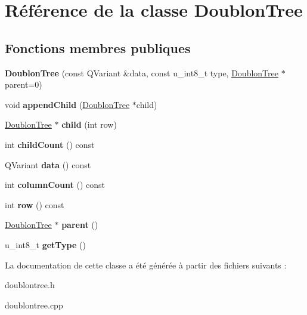 \hypertarget{class_doublon_tree}{\section{Référence de la classe Doublon\-Tree}
\label{class_doublon_tree}
}
\subsection*{Fonctions membres publiques}
\begin{DoxyCompactItemize}
\item 
\hypertarget{class_doublon_tree_aeef7a22a4ecbbd4e936325c9699848a0}{{\bfseries Doublon\-Tree} (const Q\-Variant \&data, const u\-\_\-int8\-\_\-t type, \hyperlink{class_doublon_tree}{Doublon\-Tree} $\ast$parent=0)}\label{class_doublon_tree_aeef7a22a4ecbbd4e936325c9699848a0}

\item 
\hypertarget{class_doublon_tree_aa6b40c180f310fcd948fb2629b2ef10c}{void {\bfseries append\-Child} (\hyperlink{class_doublon_tree}{Doublon\-Tree} $\ast$child)}\label{class_doublon_tree_aa6b40c180f310fcd948fb2629b2ef10c}

\item 
\hypertarget{class_doublon_tree_a03b05097f7c811686d7a7ae67f56b8ee}{\hyperlink{class_doublon_tree}{Doublon\-Tree} $\ast$ {\bfseries child} (int row)}\label{class_doublon_tree_a03b05097f7c811686d7a7ae67f56b8ee}

\item 
\hypertarget{class_doublon_tree_ad048f4249d32acc81a203465f5569312}{int {\bfseries child\-Count} () const }\label{class_doublon_tree_ad048f4249d32acc81a203465f5569312}

\item 
\hypertarget{class_doublon_tree_a587ca20a3be3ed2829b36dbfda00be05}{Q\-Variant {\bfseries data} () const }\label{class_doublon_tree_a587ca20a3be3ed2829b36dbfda00be05}

\item 
\hypertarget{class_doublon_tree_a1ccd8565e780ff0cc31b3b5d982737c0}{int {\bfseries column\-Count} () const }\label{class_doublon_tree_a1ccd8565e780ff0cc31b3b5d982737c0}

\item 
\hypertarget{class_doublon_tree_a108bb7946eef6efb9057911cf90f6095}{int {\bfseries row} () const }\label{class_doublon_tree_a108bb7946eef6efb9057911cf90f6095}

\item 
\hypertarget{class_doublon_tree_a378ba45c738cbebf3e7527b98b457f65}{\hyperlink{class_doublon_tree}{Doublon\-Tree} $\ast$ {\bfseries parent} ()}\label{class_doublon_tree_a378ba45c738cbebf3e7527b98b457f65}

\item 
\hypertarget{class_doublon_tree_a2885ec60d59853eef0b1932f0068e9ca}{u\-\_\-int8\-\_\-t {\bfseries get\-Type} ()}\label{class_doublon_tree_a2885ec60d59853eef0b1932f0068e9ca}

\end{DoxyCompactItemize}


La documentation de cette classe a été générée à partir des fichiers suivants \-:\begin{DoxyCompactItemize}
\item 
doublontree.\-h\item 
doublontree.\-cpp\end{DoxyCompactItemize}

